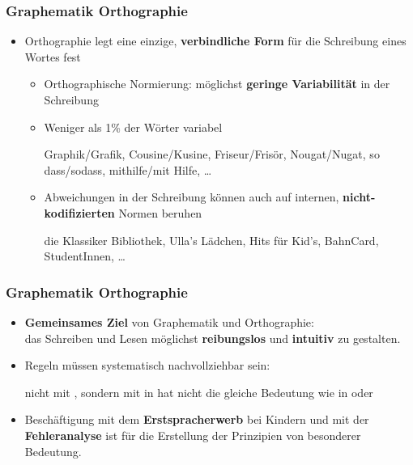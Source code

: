 \begin{frame}
\frametitle{Graphematik \vs Orthographie}

\begin{itemize}
	\item Orthographie legt \idR eine einzige, \textbf{verbindliche Form} für die Schreibung eines Wortes fest
	
	\begin{itemize}
		\item Orthographische Normierung: möglichst \textbf{geringe Variabilität} in der Schreibung

\pause

		\item Weniger als 1\% der Wörter variabel
			
		\ea Graphik/Grafik, Cousine/Kusine, Friseur/Frisör, Nougat/Nugat, so dass/sodass, mithilfe/mit Hilfe, \dots
		\z

\pause 
			
		\item Abweichungen in der Schreibung können auch auf internen, \textbf{nicht-kodifizierten} Normen beruhen
			
		\ea die Klassiker Bibliothek, Ulla's Lädchen, Hits für Kid's, BahnCard, StudentInnen, \dots
		\z
	\end{itemize}
\end{itemize}

\end{frame}


\begin{frame}
\frametitle{Graphematik \vs Orthographie}

\begin{itemize}
	\item \textbf{Gemeinsames Ziel} von Graphematik und Orthographie:\\
	 das Schreiben und Lesen möglichst \textbf{reibungslos} und \textbf{intuitiv} zu gestalten.

	\item Regeln müssen systematisch nachvollziehbar sein:
	
	\ea {} nicht mit , sondern mit  \ras {} in  hat nicht die gleiche Bedeutung wie  in  oder 
	\z
	
	\item Beschäftigung mit dem \textbf{Erstspracherwerb} bei Kindern und mit der \textbf{Fehleranalyse} ist für die Erstellung der Prinzipien von besonderer Bedeutung.
\end{itemize}

\end{frame}


